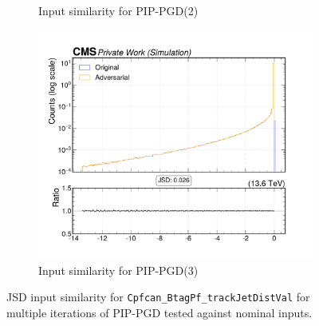 \begin{figure}[htbp]
\begin{subfigure}[t]{0.32\textwidth}
    \caption*{Input similarity for PIP-PGD(2)}
  \end{subfigure}\hfill
  \begin{subfigure}[t]{0.32\textwidth}
    \includegraphics[width=\linewidth]{media/output/features/compare/combined_it_3/cmp_cpf_arr_Cpfcan_BtagPf_trackJetDistVal.pdf}
    \caption*{Input similarity for PIP-PGD(3)}
  \end{subfigure}

  \caption*{JSD input similarity for \texttt{Cpfcan\_BtagPf\_trackJetDistVal} for multiple iterations of PIP-PGD tested against nominal inputs.}
  \label{fig:combined_input_Cpfcan_BtagPf_trackJetDistVal}
\end{figure}

